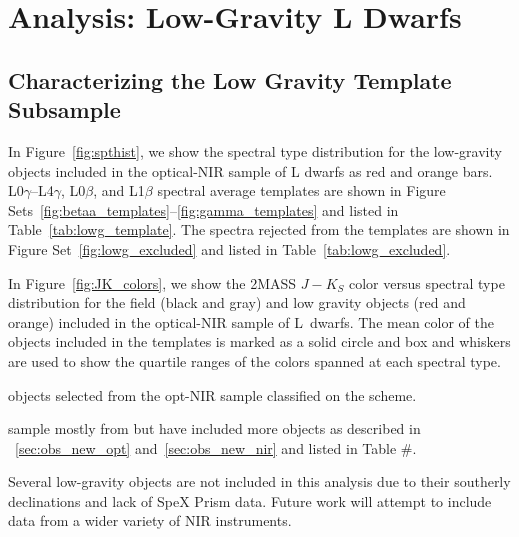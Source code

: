 \documentclass[12pt,preprint]{aastex}
\begin{document}

\clearpage
\section{Analysis: Low-Gravity L Dwarfs}
\label{sec:lowg}


\subsection{Characterizing the Low Gravity Template Subsample}
\label{sec:templates_lowg}

In Figure~\ref{fig:spthist}, we show the spectral type distribution for the low-gravity objects included in the optical-NIR sample of L dwarfs as red and orange bars. L0$\gamma$--L4$\gamma$, L0$\beta$, and L1$\beta$ spectral average templates are shown in Figure Sets~\ref{fig:betaa_templates}--\ref{fig:gamma_templates} and listed in Table~\ref{tab:lowg_template}. The spectra rejected from the templates are shown in Figure Set~\ref{fig:lowg_excluded} and listed in Table~\ref{tab:lowg_excluded}.

In Figure~\ref{fig:JK_colors}, we show the 2MASS $J-K_S$ color versus spectral type distribution for the field (black and gray) and low gravity objects (red and orange) included in the optical-NIR sample of L~dwarfs. The mean color of the objects included in the templates is marked as a solid circle and box and whiskers are used to show the quartile ranges of the colors spanned at each spectral type. 

objects selected from the opt-NIR sample classified on the \citet{Cruz09_lowg} scheme.

sample mostly from \citet{Cruz09_lowg} but have included more objects as described in \SS~\ref{sec:obs_new_opt} and~\ref{sec:obs_new_nir} and listed in Table \#.

Several low-gravity objects are not included in this analysis due to their southerly declinations and lack of SpeX Prism data. Future work will attempt to include data from a wider variety of NIR instruments.
\end{document}
